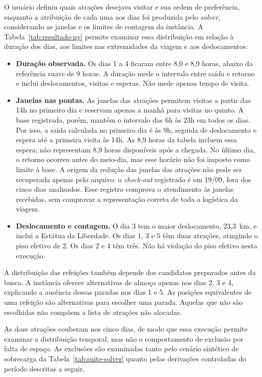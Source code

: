 O usuário definiu quais atrações desejava visitar e sua ordem de preferência, enquanto a atribuição de cada uma aos dias foi produzida pelo \textit{solver}, considerando as janelas e os limites de contagem da instância. A Tabela~\ref{tab:resultado-ny} permite examinar essa distribuição em relação à duração dos dias, aos limites nas extremidades da viagem e aos deslocamentos:

\begin{itemize}
  \item \textbf{Duração observada.} Os dias 1 a 4 ficaram entre 8,0 e 8,9 horas, abaixo da referência suave de 9 horas. A duração mede o intervalo entre saída e retorno e inclui deslocamentos, visitas e esperas. Não mede apenas tempo de visita.
  \item \textbf{Janelas nas pontas.} As janelas das atrações permitem visitas a partir das 14h no primeiro dia e reservam apenas a manhã para visitas no quinto. A base registrada, porém, mantém o intervalo das 6h às 23h em todos os dias. Por isso, a saída calculada no primeiro dia é às 9h, seguida de deslocamento e espera até a primeira visita às 14h. As 8,9 horas da tabela incluem essa espera; não representam 8,9 horas disponíveis após a chegada. No último dia, o retorno ocorreu antes do meio-dia, mas esse horário não foi imposto como limite à base. A origem da redução das janelas das atrações não pode ser recuperada apenas pelo arquivo: o \textit{check-out} registrado é em 19/09, fora dos cinco dias analisados. Esse registro comprova o atendimento às janelas recebidas, sem comprovar a representação correta de toda a logística da viagem.
  \item \textbf{Deslocamento e contagem.} O dia 3 tem o maior deslocamento, 23,3~km, e inclui a Estátua da Liberdade. Os dias 1, 3 e 5 têm duas atrações, atingindo o piso efetivo de 2. Os dias 2 e 4 têm três. Não há violação do piso efetivo nesta execução.
\end{itemize}

A distribuição das refeições também depende dos candidatos preparados antes da busca. A instância oferece alternativas de almoço apenas nos dias 2, 3 e 4, explicando a ausência dessas paradas nos dias 1 e 5. As posições equivalentes de uma refeição são alternativas para escolher uma parada. Aquelas que não são escolhidas não compõem a lista de atrações não alocadas.

As doze atrações couberam nos cinco dias, de modo que essa execução permite examinar a distribuição temporal, mas não o comportamento de exclusão por falta de espaço. As exclusões são examinadas tanto pelo cenário sintético de sobrecarga da Tabela~\ref{tab:suite-solver} quanto pelas derivações controladas do período descritas a seguir.

